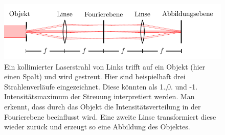 \begin{figure}[h]
	\centering
	\includegraphics[scale=1]{graphs/theorie/abbildung.pdf}
	\caption[Illustration: Inverse und Fouriertransformation an Linsen]{
		Ein kollimierter Laserstrahl von Links trifft auf ein Objekt (hier einen Spalt) und wird gestreut. Hier sind beispielhaft drei Strahlenverläufe eingezeichnet. Diese könnten als 1.,0. und -1. Intensitätsmaximum der Streuung interpretiert werden. Man erkennt, dass durch das Objekt die Intensitätsverteilung in der Fourierebene beeinflusst wird. Eine zweite Linse transformiert diese wieder zurück und erzeugt so eine Abbildung des Objektes.
	} \label{fig:ft-an-linse}
\end{figure}